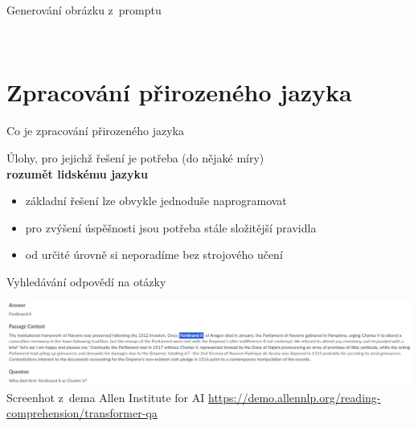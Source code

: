 \documentclass[aspectratio=169,dvipsnames]{beamer}
\begin{document}
\begin{frame}{Generování obrázku z~promptu}
\begin{center}
\begin{tikzpicture}[>=latex]
    \end{tikzpicture}
    \end{center}

    \vspace{10pt}
     \\

\end{frame}



\section[Zpracování jazyka]{Zpracování přirozeného jazyka}

\begin{frame}{Co je zpracování přirozeného jazyka}

    \begin{center}

        \Large Úlohy, pro jejichž řešení je potřeba (do nějaké míry) \\ \textbf{rozumět
        lidskému jazyku}

    \end{center}

    \begin{itemize}[<+->]

        \item<2-> základní řešení lze obvykle jednoduše naprogramovat

        \item<3-> pro zvýšení úspěšnosti jsou potřeba stále složitější pravidla

        \item<4-> od určité úrovně si neporadíme bez strojového učení

    \end{itemize}

\end{frame}


\begin{frame}{Vyhledávání odpovědí na otázky}

    \centering
    \includegraphics[scale=.26]{img/qa.png} \\
    {\tiny Screenhot z~dema Allen Institute for AI \url{https://demo.allennlp.org/reading-comprehension/transformer-qa}}

\end{frame}
\end{document}
